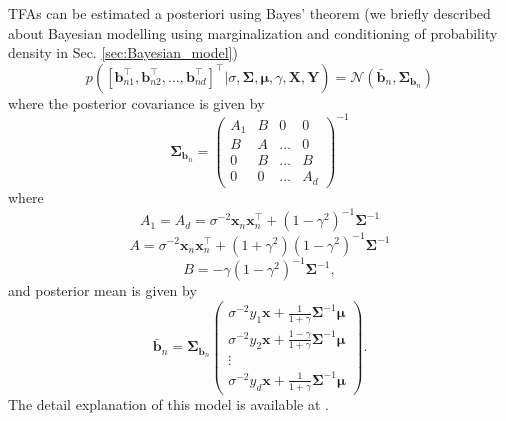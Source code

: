 TFAs can be estimated a posteriori using Bayes’ theorem (we briefly described about Bayesian modelling using marginalization and conditioning of probability density in Sec. \ref{sec:Bayesian_model})
\begin{equation} \label{eq:est_TFA}
 p\left(\left[\textbf{b}^\top_{n1}, \textbf{b}^\top_{n2}, \dots, \textbf{b}^\top_{nd} \right]^\top| \sigma,\boldsymbol{\Sigma},\boldsymbol{\mu},\gamma,\textbf{X},\textbf{Y}\right)= \mathcal{N}\left(\bar{\textbf{b}}_n, \boldsymbol{\Sigma}_{\textbf{b}_n} \right)
\end{equation}
where the posterior covariance is given by
\begin{equation} \label{eq:post_Cov_TFA}
\boldsymbol{\Sigma}_{\textbf{b}_n} = 
 \begin{pmatrix}
  A_1 & B & 0 & 0 \\
  B & A & \dots & 0 \\
  0 & B & \dots & B  \\
  0 & 0 & \dots & A_d
 \end{pmatrix}^{-1}
\end{equation}
where
\begin{equation*}
 A_1 = A_d = \sigma^{-2}\textbf{x}_n\textbf{x}^\top_n+\left(1-\gamma^2\right)^{-1}\boldsymbol{\Sigma}^{-1}
\end{equation*}
\begin{equation*}
 A = \sigma^{-2}\textbf{x}_n\textbf{x}^\top_n+\left(1+\gamma^2\right)\left(1-\gamma^2\right)^{-1}\boldsymbol{\Sigma}^{-1}
\end{equation*}
\begin{equation*}
 B =-\gamma\left(1-\gamma^2\right)^{-1}\boldsymbol{\Sigma}^{-1},
\end{equation*}
and posterior mean is given by
\begin{equation} \label{eq:post_mean_TFA}
\bar{\textbf{b}}_n = \boldsymbol{\Sigma}_{\textbf{b}_n}
 \begin{pmatrix}
  \sigma^{-2}y_1\textbf{x}+\frac{1}{1+\gamma} \boldsymbol{\Sigma}^{-1}\boldsymbol{\mu} \\
  \sigma^{-2}y_2\textbf{x}+\frac{1-\gamma}{1+\gamma} \boldsymbol{\Sigma}^{-1}\boldsymbol{\mu} \\
  \vdots\\
  \sigma^{-2}y_d\textbf{x}+\frac{1}{1+\gamma} \boldsymbol{\Sigma}^{-1}\boldsymbol{\mu}
 \end{pmatrix}.
\end{equation}
The detail explanation of this model is available at \cite{Sanguinetti:2006}.

